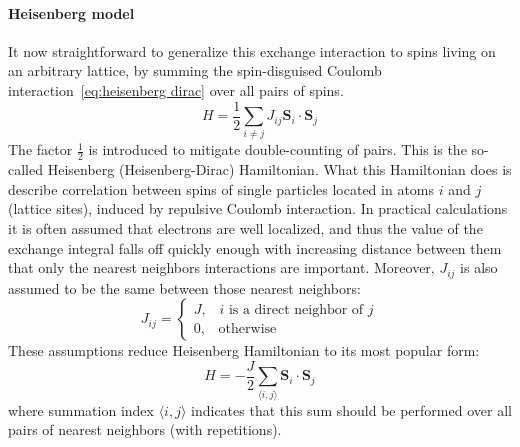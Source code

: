 \paragraph{Heisenberg model}It now straightforward to generalize this exchange interaction to spins living on an arbitrary
lattice, by summing the spin-disguised Coulomb interaction~\eqref{eq:heisenberg dirac} over all pairs
of spins.
\begin{equation}
    H = \frac{1}{2}\sum_{i\neq j} J_{ij} \bm{S}_i \cdot \bm{S}_j
    \label{eq:Heisenberg model}
\end{equation}
The factor \(\frac{1}{2}\) is introduced to mitigate double-counting of pairs.
This is the so-called Heisenberg (Heisenberg-Dirac) Hamiltonian. What this Hamiltonian
does is describe correlation between spins of single particles located in atoms \(i\) and \(j\)
(lattice sites), induced by repulsive Coulomb interaction. 
In practical calculations it is often assumed that electrons are well localized, and thus
the value of the exchange integral falls off quickly enough with increasing distance between them
that only the nearest neighbors interactions are important. Moreover, \(J_{ij}\) is also assumed
to be the same between those nearest neighbors:
\begin{equation}
    J_{ij} = \begin{cases}
        J,\;\;\; i \textrm{ is a direct neighbor of } j\\
        0,\;\;\; \textrm{otherwise}
    \end{cases}
\end{equation}
These assumptions reduce Heisenberg Hamiltonian to its most popular form:
\begin{equation}
    H = -\frac{J}{2}\sum_{\langle i,j \rangle} \bm{S}_i \cdot \bm{S}_j
    \label{eq:canonical Heisenberg}
\end{equation}
where summation index \(\langle i,j \rangle\) indicates that this sum should be performed over all pairs
of nearest neighbors (with repetitions).

